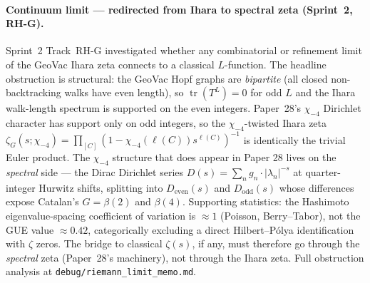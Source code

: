 \documentclass[11pt]{article}
\begin{document}
\paragraph{Continuum limit --- redirected from Ihara to spectral zeta
(Sprint~2, RH-G).}  Sprint~2 Track~RH-G investigated whether any
combinatorial or refinement limit of the GeoVac Ihara zeta connects
to a classical $L$-function.  The headline obstruction is structural:
the GeoVac Hopf graphs are \emph{bipartite} (all closed
non-backtracking walks have even length), so $\operatorname{tr}(T^L)=0$
for odd $L$ and the Ihara walk-length spectrum is supported on the
even integers.  Paper~28's $\chi_{-4}$ Dirichlet character has support
only on odd integers, so the $\chi_{-4}$-twisted Ihara zeta
$\zeta_G(s;\chi_{-4}) = \prod_{[C]}(1 - \chi_{-4}(\ell(C))s^{\ell(C)})^{-1}$
is identically the trivial Euler product.  The $\chi_{-4}$ structure
that does appear in Paper 28 lives on the \emph{spectral} side --- the
Dirac Dirichlet series $D(s) = \sum_{n} g_n\cdot |\lambda_n|^{-s}$ at
quarter-integer Hurwitz shifts, splitting into $D_{\text{even}}(s)$ and
$D_{\text{odd}}(s)$ whose differences expose Catalan's $G=\beta(2)$
and $\beta(4)$.  Supporting statistics: the Hashimoto eigenvalue-spacing
coefficient of variation is $\approx 1$ (Poisson, Berry--Tabor), not
the GUE value $\approx 0.42$, categorically excluding a direct
Hilbert--P\'olya identification with $\zeta$ zeros.  The bridge to
classical $\zeta(s)$, if any, must therefore go through the
\emph{spectral} zeta (Paper~28's machinery), not through the Ihara
zeta.  Full obstruction analysis at
\texttt{debug/riemann\_limit\_memo.md}.
\end{document}
